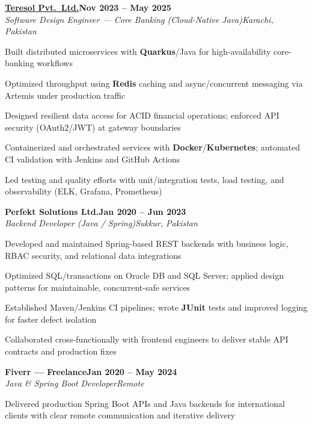 \documentclass[letterpaper,10pt]{article}
\newcommand{\heading}[2]{
  \hspace{8pt}#1\hfill#2\\
}
\newcommand{\headingBf}[2]{
  \heading{\textbf{#1}}{\textbf{#2}}
}
\newcommand{\headingIt}[2]{
  \heading{\textit{#1}}{\textit{#2}}
}
\newenvironment{resume_list}{
  \vspace{-6pt}
  \begin{itemize}[itemsep=-1px, parsep=0.5pt, topsep=1pt, leftmargin=22pt]
}{
  \end{itemize}
  \vspace{-2pt}
}
\begin{document}
\vspace{2pt}
\headingBf{\href{https://teresol.com/}{Teresol Pvt.\ Ltd.}}{Nov 2023 -- May 2025}
\headingIt{Software Design Engineer --- Core Banking (Cloud-Native Java)}{Karachi, Pakistan}
\begin{resume_list}
  \item Built distributed microservices with \textbf{Quarkus}/Java for high-availability core-banking workflows
  \item Optimized throughput using \textbf{Redis} caching and async/concurrent messaging via Artemis under production traffic
  \item Designed resilient data access for ACID financial operations; enforced API security (OAuth2/JWT) at gateway boundaries
  \item Containerized and orchestrated services with \textbf{Docker}/\textbf{Kubernetes}; automated CI validation with Jenkins and GitHub Actions
  \item Led testing and quality efforts with unit/integration tests, load testing, and observability (ELK, Grafana, Prometheus)
\end{resume_list}

\vspace{2pt}
\headingBf{Perfekt Solutions Ltd.}{Jan 2020 -- Jun 2023}
\headingIt{Backend Developer (Java / Spring)}{Sukkur, Pakistan}
\begin{resume_list}
  \item Developed and maintained Spring-based REST backends with business logic, RBAC security, and relational data integrations
  \item Optimized SQL/transactions on Oracle DB and SQL Server; applied design patterns for maintainable, concurrent-safe services
  \item Established Maven/Jenkins CI pipelines; wrote \textbf{JUnit} tests and improved logging for faster defect isolation
  \item Collaborated cross-functionally with frontend engineers to deliver stable API contracts and production fixes
\end{resume_list}

\vspace{2pt}
\headingBf{Fiverr --- Freelance}{Jan 2020 -- May 2024}
\headingIt{Java \& Spring Boot Developer}{Remote}
\begin{resume_list}
  \item Delivered production Spring Boot APIs and Java backends for international clients with clear remote communication and iterative delivery
\end{resume_list}
\end{document}
